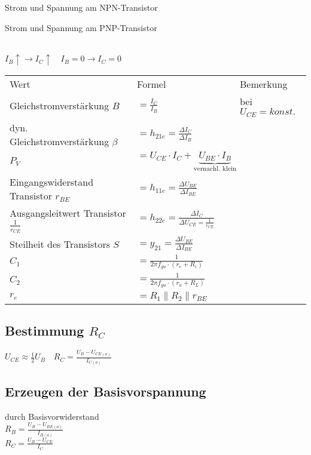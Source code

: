     \begin{minipage}{0.5\columnwidth}
        Strom und Spannung am NPN-Transistor
    \end{minipage}
    \begin{minipage}{0.5\columnwidth}
        Strom und Spannung am PNP-Transistor    
    \end{minipage}
    \noindent\\
    $I_B\uparrow\rightarrow I_C\uparrow\quad I_B=0\rightarrow I_C=0$
    \renewcommand{\arraystretch}{1.0}
    \begin{table}[H]
        \begin{tabularx}{\columnwidth}{l l l}
            Wert & Formel & Bemerkung \\
            Gleichstromverstärkung $B$ & $=\frac{I_C}{I_B}$ & bei $U_{CE}=konst.$ \\
            dyn. Gleichstromverstärkung $\beta$ & $=h_{21e}=\frac{\Delta I_C}{\Delta I_B}$ & \\
            $P_V$ & $=U_{CE}\cdot I_C + \underbrace{U_{BE}\cdot I_B}_\text{vernachl. klein}$ & \\
            Eingangswiderstand Transistor $r_{BE}$ & $=h_{11e}=\frac{\Delta U_{BE}}{\Delta I_{BE}}$ & \\
            Ausgangsleitwert Transistor $\frac{1}{r_{CE}}$ & $=h_{22e}=\frac{\Delta I_C}{\Delta U_{CE}=\frac{1}{r_{CE}}}$ & \\
            Steilheit des Transistors $S$ & $=y_{21}=\frac{\Delta U_{BE}}{\Delta I_{BE}}$ & \\
            $C_1$ & $=\frac{1}{2\pi f_{gu}\cdot (r_e+R_i)}$ & \\
            $C_2$ & $=\frac{1}{2\pi f_{gu}\cdot (r_a+R_L)}$ & \\
            $r_e$ & $=R_1\parallel R_2\parallel r_{BE}$
        \end{tabularx}
    \end{table}
    \subsection{Bestimmung $R_C$}
    $U_{CE}\approx \frac{1}{2}U_B\quad R_C=\frac{U_B-U_{CE(a)}}{I_{C(a)}}$

    \subsection{Erzeugen der Basisvorspannung}
    \begin{minipage}{0.5\columnwidth}
        durch Basisvorwiderstand\\
        $R_B=\frac{U_B-U_{BE(a)}}{I_{B(a)}}$\\ %
        $R_C=\frac{U_B-U_{CE}}{I_C}$
    \end{minipage}
    \begin{minipage}{0.5\columnwidth}
    \end{minipage}

